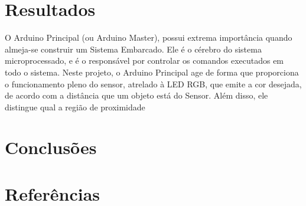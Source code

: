 \documentclass[conference]{IEEEtran}
\begin{document}
\section{Resultados}
    O Arduino Principal (ou Arduino Master), possui extrema importância quando almeja-se construir 
um Sistema Embarcado. Ele é o cérebro do sistema microprocessado, e é o responsável por controlar
os comandos executados em todo o sistema. Neste projeto, o Arduino Principal age de forma que proporciona
o funcionamento pleno do sensor, atrelado à LED RGB, que emite a cor desejada, de acordo com a 
distância que um objeto está do Sensor. Além disso, ele distingue qual a região de proximidade

\section{Conclusões}

\section{Referências}
\end{document}
